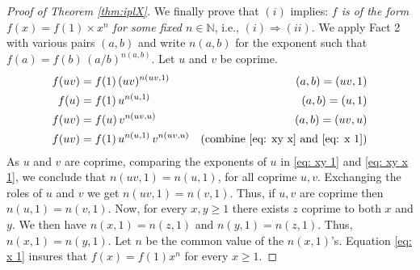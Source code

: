 \documentclass[11pt,a4paper]{article}
\theoremstyle{definition} %
\newcommand\+[1]{\mathcal{#1}} %
\newcommand{\N}{{\mathbb N}}     %
\begin{document}
\begin{proof} [Proof of Theorem \ref{thm:iplX}]
\smallskip
We finally prove that $(i)$ implies: {\em $f$ is  of the form $f(x)=f(1)\times x^n$ for some fixed $n\in\N$}, i.e.,  $(i)\Rightarrow(ii)$.
We apply Fact 2  with various pairs $(a,b)$ and write $n(a,b)$ for the exponent 
such that $f(a)=f(b)\,(a/b)^{n(a,b)}$.
Let $u$ and $v$ be coprime.
\begin{align}\label{eq: xy 1}
f(uv) &= f(1)\, (uv)^{n(uv,1)} &\text{$(a,b)=(uv,1)$}
\\\label{eq: x 1}
f(u) &= f(1)\, u^{n(u,1)} &\text{$(a,b)=(u,1)$}
\\\label{eq: xy x}
f(uv) &= f(u)\, v^{n(uv,u)}  &\text{$(a,b)=(uv,u)$}
\\\label{eq: xy x 1}
f(uv)&= f(1)\, u^{n(u,1)} \, v^{n(uv,u)} &\text{(combine \eqref{eq: xy x} and \eqref{eq: x 1})}
\end{align}
As $u$ and $v$ are coprime, 
comparing the exponents of $u$ in \eqref{eq: xy 1} and \eqref{eq: xy x 1},
we conclude that $n(uv,1) = n(u,1)$, for all coprime $u,v$.
Exchanging the roles of $u$ and $v$ we get $n(uv,1) = n(v,1)$.
Thus, if $u,v$ are coprime then $n(u,1)=n(v,1)$.
Now, for every $x,y\geq1$ there exists $z$ coprime to both $x$ and $y$.
We then have $n(x,1)=n(z,1)$ and $n(y,1)=n(z,1)$.
Thus, $n(x,1)=n(y,1)$.
Let $n$ be the common value of the $n(x,1)$'s. Equation \eqref{eq: x 1}
insures that $f(x)=f(1)x^n$ for every $x\geq1$.



\end{proof}
\end{document}

